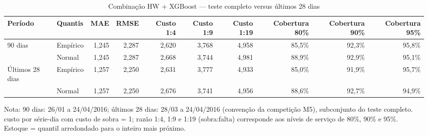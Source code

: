 \begin{table}[htbp]
\centering
\small
\caption{Combinação HW + XGBoost — teste completo versus últimos 28 dias}
\label{tab:comb_verificacao_28d}
\begin{tabular}{llrrrrrrrr}
\toprule
Período & Quantis & MAE & RMSE & Custo 1:4 & Custo 1:9 & Custo 1:19 & Cobertura 80\% & Cobertura 90\% & Cobertura 95\% \\
\midrule
90 dias & Empírico & 1,245 & 2,287 & 2,620 & 3,768 & 4,958 & 85,5\% & 92,3\% & 95,8\% \\
 & Normal & 1,245 & 2,287 & 2,668 & 3,744 & 4,981 & 88,9\% & 92,9\% & 95,1\% \\
\addlinespace
Últimos 28 dias & Empírico & 1,257 & 2,250 & 2,631 & 3,777 & 4,933 & 85,0\% & 91,9\% & 95,7\% \\
 & Normal & 1,257 & 2,250 & 2,676 & 3,741 & 4,956 & 88,6\% & 92,7\% & 94,9\% \\
\bottomrule
\end{tabular}
\par\smallskip
{\footnotesize Nota: 90 dias: 26/01 a 24/04/2016; últimos 28 dias: 28/03 a 24/04/2016 (convenção da competição M5), subconjunto do teste completo. custo por série-dia com custo de sobra = 1; razão 1:4, 1:9 e 1:19 (sobra:falta) corresponde aos níveis de serviço de 80\%, 90\% e 95\%. Estoque = quantil arredondado para o inteiro mais próximo.}
\end{table}

